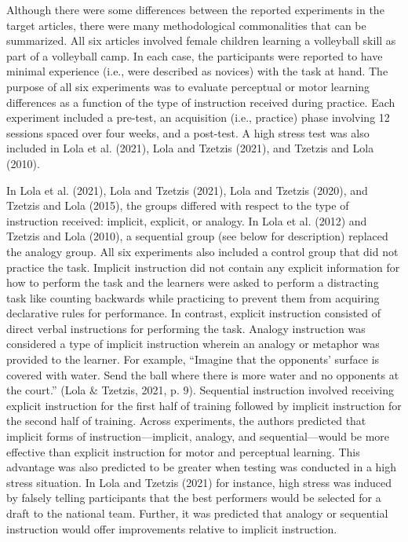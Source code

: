 \documentclass[
  english,
  man, donotrepeattitle,floatsintext]{apa7}
\begin{document}
Although there were some differences between the reported experiments in the target articles, there were many methodological commonalities that can be summarized. All six articles involved female children learning a volleyball skill as part of a volleyball camp. In each case, the participants were reported to have minimal experience (i.e., were described as novices) with the task at hand. The purpose of all six experiments was to evaluate perceptual or motor learning differences as a function of the type of instruction received during practice. Each experiment included a pre-test, an acquisition (i.e., practice) phase involving 12 sessions spaced over four weeks, and a post-test. A high stress test was also included in Lola et al. (2021), Lola and Tzetzis (2021), and Tzetzis and Lola (2010).

In Lola et al. (2021), Lola and Tzetzis (2021), Lola and Tzetzis (2020), and Tzetzis and Lola (2015), the groups differed with respect to the type of instruction received: implicit, explicit, or analogy. In Lola et al. (2012) and Tzetzis and Lola (2010), a sequential group (see below for description) replaced the analogy group. All six experiments also included a control group that did not practice the task. Implicit instruction did not contain any explicit information for how to perform the task and the learners were asked to perform a distracting task like counting backwards while practicing to prevent them from acquiring declarative rules for performance. In contrast, explicit instruction consisted of direct verbal instructions for performing the task. Analogy instruction was considered a type of implicit instruction wherein an analogy or metaphor was provided to the learner. For example, ``Imagine that the opponents' surface is covered with water. Send the ball where there is more water and no opponents at the court.'' (Lola \& Tzetzis, 2021, p. 9). Sequential instruction involved receiving explicit instruction for the first half of training followed by implicit instruction for the second half of training. Across experiments, the authors predicted that implicit forms of instruction---implicit, analogy, and sequential---would be more effective than explicit instruction for motor and perceptual learning. This advantage was also predicted to be greater when testing was conducted in a high stress situation. In Lola and Tzetzis (2021) for instance, high stress was induced by falsely telling participants that the best performers would be selected for a draft to the national team. Further, it was predicted that analogy or sequential instruction would offer improvements relative to implicit instruction.
\end{document}
